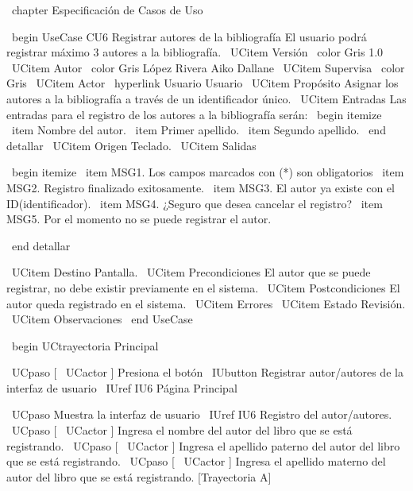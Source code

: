 \ chapter {Especificación de Casos de Uso}

\ begin {UseCase} {CU6} {Registrar autores de la bibliografía} {El usuario podrá registrar máximo 3 autores a la bibliografía.}
		\ UCitem {Versión} { \ color {Gris} 1.0}
		\ UCitem {Autor} { \ color {Gris} López Rivera Aiko Dallane}
		\ UCitem {Supervisa} { \ color {Gris}}
		\ UCitem {Actor} { \ hyperlink {Usuario} {Usuario}}
		\ UCitem {Propósito} {Asignar los autores a la bibliografía a través de un identificador único.}
		\ UCitem {Entradas} {Las entradas para el registro de los autores a la bibliografía serán:
		\ begin {itemize}
			\ item Nombre del autor.
            \ item Primer apellido.
            \ item Segundo apellido. 
		\ end {detallar}
        }
		\ UCitem {Origen} {Teclado.}
		\ UCitem {Salidas} {
        	\ begin {itemize}
        		\ item MSG1. Los campos marcados con (*) son obligatorios
                \ item MSG2. Registro finalizado exitosamente.
                \ item MSG3. El autor ya existe con el ID(identificador).
                \ item MSG4. ¿Seguro que desea cancelar el registro?
                \ item MSG5. Por el momento no se puede registrar el autor. 

        	\ end {detallar}
        }
		\ UCitem {Destino} {Pantalla.}
		\ UCitem {Precondiciones} {El autor que se puede registrar, no debe existir previamente en el sistema.}
		\ UCitem {Postcondiciones} {El autor queda registrado en el sistema.}
		\ UCitem {Errores} {}
		\ UCitem {Estado} {Revisión.}
		\ UCitem {Observaciones} {}
\ end {UseCase}

\ begin {UCtrayectoria} {Principal}

    \ UCpaso [ \ UCactor ] Presiona el botón \ IUbutton {Registrar autor/autores} de la interfaz de usuario \ IUref {IU6} {Página Principal}


    \ UCpaso Muestra la interfaz de usuario \ IUref {IU6} {Registro del autor/autores}.
    \ UCpaso [ \ UCactor ] Ingresa el nombre del autor del libro que se está registrando.
    \ UCpaso [ \ UCactor ] Ingresa el apellido paterno del autor del libro que se está registrando.
    \ UCpaso [ \ UCactor ] Ingresa el apellido materno del autor del libro que se está registrando. [Trayectoria A]


